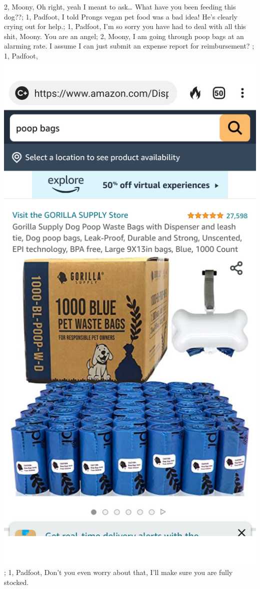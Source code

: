 \documentclass[12pt,twoside,openright]{memoir}
\newcommand\smsFrom{1}
\newcommand\smsTo{2}
\newcommand\Padfoot{Padfoot}
\newcommand\Moony{Moony}
\begin{document}
{	\smsTo, {\Moony}, {Oh right, yeah I meant to ask… What have you been feeding this dog??};
	\smsFrom, {\Padfoot}, {I told Prongs vegan pet food was a bad idea! He's clearly crying out for help.};
	\smsFrom, {\Padfoot}, {I'm so sorry you have had to deal with all this shit, Moony. You are an angel};
	\smsTo, {\Moony}, {I am going through poop bags at an alarming rate. I assume I can just submit an expense report for reimbursement? };
	\smsFrom, {\Padfoot}, {\centering\includegraphics[width=\textwidth]{Screenshot_20220615-103936}};
	\smsFrom, {\Padfoot}, {Don't you even worry about that, I'll make sure you are fully stocked.}
}
\end{document}
